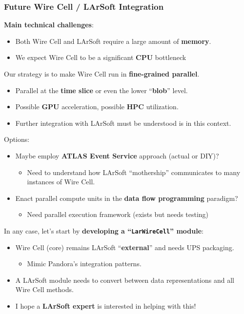 \documentclass[xcolor=dvipsnames]{beamer}
\begin{document}
\begin{frame}
  \frametitle{Future Wire Cell / LArSoft Integration}

  \scriptsize

  \textbf{Main technical challenges}:
  \begin{itemize}
  \item Both Wire Cell and LArSoft require a large amount
    of \textbf{memory}.
  \item We expect Wire Cell to be a significant \textbf{CPU} bottleneck
  \end{itemize}

  Our strategy is to make Wire Cell run in \textbf{fine-grained parallel}.
  \begin{itemize}
  \item Parallel at the \textbf{time slice} or even the lower ``\textbf{blob}'' level.
  \item Possible \textbf{GPU} acceleration, possible \textbf{HPC} utilization.
  \item Further integration with LArSoft must be understood is in this context.
  \end{itemize}

  Options:
  \begin{itemize}
  \item Maybe employ \textbf{ATLAS Event Service} approach (actual or DIY)?
    \begin{itemize}
    \scriptsize
    \item Need to understand how LArSoft ``mothership'' communicates to many
      instances of Wire Cell.
    \end{itemize}
  \item Enact parallel compute units in the \textbf{data flow programming} paradigm?
    \begin{itemize}
    \scriptsize
    \item Need parallel execution framework (exists but needs testing)
    \end{itemize}
  \end{itemize}

  In any case, let's start by \textbf{developing a ``\texttt{LarWireCell}'' module}:
  \begin{itemize}
  \item Wire Cell (core) remains LArSoft ``\textbf{external}'' and needs UPS packaging.
    \begin{itemize}
      \tiny
    \item Mimic Pandora's integration patterns.
    \end{itemize}
  \item A LArSoft module needs to convert between data representations
    and all Wire Cell methods.
  \item I hope a \textbf{LArSoft expert} is interested in helping with this!
  \end{itemize}


\end{frame}
\end{document}
